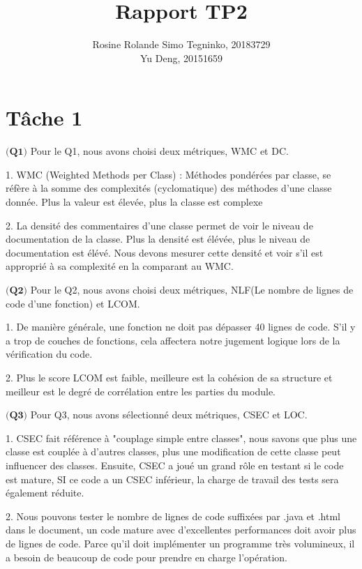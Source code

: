 \documentclass{article}
\title{Rapport TP2}
\author{Rosine Rolande Simo Tegninko, 20183729\\
Yu Deng, 20151659}
\date{}
\begin{document}
\maketitle

\section*{Tâche 1}

\item$\textbf{(Q1)}$
Pour le Q1, nous avons choisi deux métriques, WMC et DC.

1.	WMC (Weighted Methods per Class) : Méthodes pondérées par classe, se réfère à
la somme des complexités (cyclomatique) des méthodes d'une classe donnée. Plus la
valeur est élevée, plus la classe est complexe

2. La densité des commentaires d'une classe permet de voir le niveau de documentation de la classe. Plus la densité est élévée, plus le niveau de documentation est élévé.
Nous devons mesurer cette densité et voir s'il est approprié à sa complexité en la comparant au WMC.



\item $\textbf{(Q2)}$
Pour le Q2, nous avons choisi deux métriques, NLF(Le nombre de lignes de code d’une fonction) et LCOM.

1. De manière générale, une fonction ne doit pas dépasser 40 lignes de code. S'il y a trop de couches de fonctions, cela affectera notre jugement logique lors de la vérification du code.

2. Plus le score LCOM est faible, meilleure est la cohésion de sa structure et meilleur est le degré de corrélation entre les parties du module.


\item$\textbf{(Q3)}$
Pour Q3, nous avons sélectionné deux métriques, CSEC et LOC.


1. CSEC fait référence à "couplage simple entre classes", nous savons que plus une classe est couplée à d'autres classes, plus une modification de cette classe peut influencer des classes. Ensuite, CSEC a joué un grand rôle en testant si le code est mature, SI ce code a un CSEC inférieur, la charge de travail des tests sera également réduite.

2. Nous pouvons tester le nombre de lignes de code suffixées par .java et .html dans le document, un code mature avec d'excellentes performances doit avoir plus de lignes de code. Parce qu'il doit implémenter un programme très volumineux, il a besoin de beaucoup de code pour prendre en charge l'opération.
\end{document}
